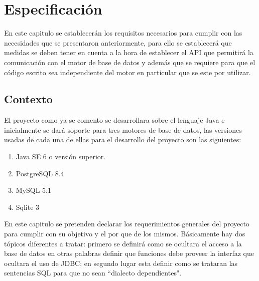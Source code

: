 \chapter{Especificación}
\label{capitulo:especificacion}
En este capitulo se establecerán los requisitos necesarios para cumplir con las necesidades que se presentaron anteriormente, para ello se establecerá que medidas se deben tener en cuenta a la hora de establecer el API que permitirá la comunicación con el motor de base de datos y además que se requiere para que el código escrito sea independiente del motor en particular que se este por utilizar.
%
%
\section{Contexto}
%
El proyecto como ya se comento se desarrollara sobre el lenguaje Java e inicialmente se dará soporte para tres motores de base de datos, las versiones usadas de cada una de ellas para el desarrollo del proyecto son las siguientes:
\begin{enumerate}
	\item Java SE 6 o versión superior.
	\item PostgreSQL 8.4
	\item MySQL 5.1
	\item Sqlite 3
\end{enumerate}
%
En este capitulo se pretenden declarar los requerimientos generales del proyecto para cumplir con su objetivo y el por que de los mismos. Básicamente hay dos tópicos diferentes a tratar: primero se definirá como se ocultara el acceso a la base de datos en otras palabras definir que funciones debe proveer la interfaz que ocultara el uso de JDBC; en segundo lugar esta definir como se trataran las sentencias SQL para que no sean ``dialecto dependientes".
%
